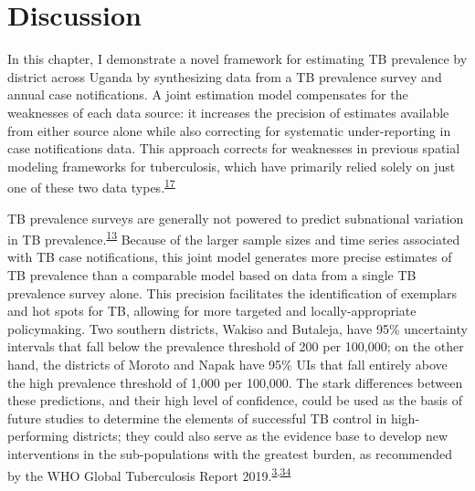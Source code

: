 \documentclass[
]{article}
\begin{document}
\hypertarget{discussion}{%
\section{Discussion}\label{discussion}}

In this chapter, I demonstrate a novel framework for estimating TB prevalence by district across Uganda by synthesizing data from a TB prevalence survey and annual case notifications. A joint estimation model compensates for the weaknesses of each data source: it increases the precision of estimates available from either source alone while also correcting for systematic under-reporting in case notifications data. This approach corrects for weaknesses in previous spatial modeling frameworks for tuberculosis, which have primarily relied solely on just one of these two data types.\textsuperscript{\protect\hyperlink{ref-Shaweno2018}{17}}

TB prevalence surveys are generally not powered to predict subnational variation in TB prevalence.\textsuperscript{\protect\hyperlink{ref-Glaziou2008}{13}} Because of the larger sample sizes and time series associated with TB case notifications, this joint model generates more precise estimates of TB prevalence than a comparable model based on data from a single TB prevalence survey alone. This precision facilitates the identification of exemplars and hot spots for TB, allowing for more targeted and locally-appropriate policymaking. Two southern districts, Wakiso and Butaleja, have 95\% uncertainty intervals that fall below the prevalence threshold of 200 per 100,000; on the other hand, the districts of Moroto and Napak have 95\% UIs that fall entirely above the high prevalence threshold of 1,000 per 100,000. The stark differences between these predictions, and their high level of confidence, could be used as the basis of future studies to determine the elements of successful TB control in high-performing districts; they could also serve as the evidence base to develop new interventions in the sub-populations with the greatest burden, as recommended by the WHO Global Tuberculosis Report 2019.\textsuperscript{\protect\hyperlink{ref-WorldHealthOrganization2019}{3},\protect\hyperlink{ref-Glaziou2018}{34}}
\end{document}
